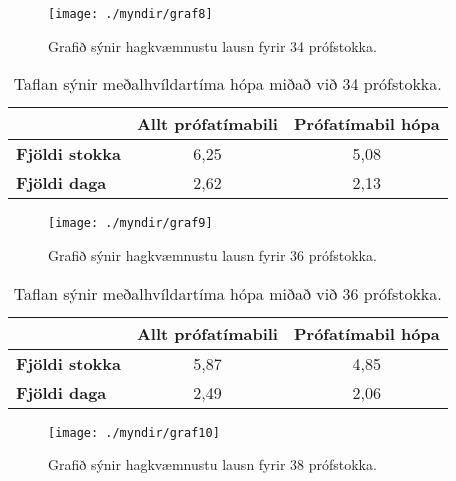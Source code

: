 \documentclass[12pt]{article}
\begin{document}
\begin{figure}[h]
    \centering
    \texttt{[image: ./myndir/graf8]}
    \caption{Grafið sýnir hagkvæmnustu lausn fyrir 34 prófstokka.}
\end{figure}

\begin{table}[h]
    \centering
    \begin{tabular}{l|c|c|}
        \cline{2-3}
        & \multicolumn{1}{l|}{\textbf{Allt prófatímabili}} & \multicolumn{1}{l|}{\textbf{Prófatímabil hópa}} \\ \hline
        \multicolumn{1}{|l|}{\textbf{Fjöldi stokka}} & 6,25                                             & 5,08                                            \\ \hline
        \multicolumn{1}{|l|}{\textbf{Fjöldi daga}}   & 2,62                                             & 2,13                                            \\ \hline
    \end{tabular}
    \caption{Taflan sýnir meðalhvíldartíma hópa miðað við 34 prófstokka.}
\end{table}



\newpage
\begin{figure}[h]
    \centering
    \texttt{[image: ./myndir/graf9]}
    \caption{Grafið sýnir hagkvæmnustu lausn fyrir 36 prófstokka.}
\end{figure}

\begin{table}[h]
    \centering
    \begin{tabular}{l|c|c|}
        \cline{2-3}
        & \multicolumn{1}{l|}{\textbf{Allt prófatímabili}} & \multicolumn{1}{l|}{\textbf{Prófatímabil hópa}} \\ \hline
        \multicolumn{1}{|l|}{\textbf{Fjöldi stokka}} & 5,87                                             & 4,85                                            \\ \hline
        \multicolumn{1}{|l|}{\textbf{Fjöldi daga}}   & 2,49                                             & 2,06                                            \\ \hline
    \end{tabular}
    \caption{Taflan sýnir meðalhvíldartíma hópa miðað við 36 prófstokka.}
\end{table}

\newpage

\begin{figure}[h]
    \centering
    \texttt{[image: ./myndir/graf10]}
    \caption{Grafið sýnir hagkvæmnustu lausn fyrir 38 prófstokka.}
\end{figure}
\end{document}
